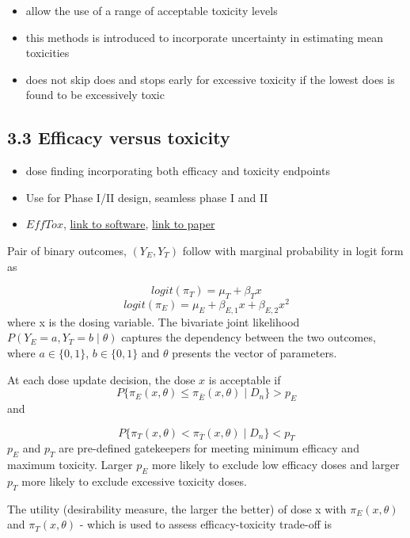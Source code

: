 \documentclass[
]{article}
\providecommand{\tightlist}{%
  \setlength{\itemsep}{0pt}\setlength{\parskip}{0pt}}
\begin{document}
\begin{itemize}
\tightlist
\item
  allow the use of a range of acceptable toxicity levels
\item
  this methods is introduced to incorporate uncertainty in estimating
  mean toxicities
\item
  does not skip does and stops early for excessive toxicity if the
  lowest does is found to be excessively toxic
\end{itemize}

\hypertarget{efficacy-versus-toxicity}{%
\subsection{3.3 Efficacy versus
toxicity}\label{efficacy-versus-toxicity}}

\begin{itemize}
\tightlist
\item
  dose finding incorporating both efficacy and toxicity endpoints
\item
  Use for Phase I/II design, seamless phase I and II
\item
  \(EffTox\),
  \href{https://biostatistics.mdanderson.org/SoftwareDownload/SingleSoftware/Index/2}{link
  to software}, \href{https://www.johndcook.com/efftox.pdf}{link to
  paper}
\end{itemize}

Pair of binary outcomes, \((Y_E, Y_T)\) follow with marginal probability
in logit form as

\[logit(\pi_T) = \mu_T + \beta_T x\]
\[logit(\pi_E) = \mu_E + \beta_{E,1} x + \beta_{E,2} x^2\] where x is
the dosing variable. The bivariate joint likelihood
\(P(Y_E=a, Y_T=b \mid \theta)\) captures the dependency between the two
outcomes, where \(a \in \{0,1\}\), \(b \in \{0,1\}\) and \(\theta\)
presents the vector of parameters.

At each dose update decision, the dose \(x\) is acceptable if
\[ P \{ \pi_{E} (x, \theta) \leq \pi_{\bar{E}} (x, \theta) \mid D_n \} > p_E\]
and

\[P \{ \pi_{T} (x, \theta) < \pi_{\bar{T}} (x, \theta) \mid D_n \} < p_T\]
\(p_E\) and \(p_T\) are pre-defined gatekeepers for meeting minimum
efficacy and maximum toxicity. Larger \(p_E\) more likely to exclude low
efficacy doses and larger \(p_T\) more likely to exclude excessive
toxicity doses.

The utility (desirability measure, the larger the better) of dose x with
\(\pi_E(x, \theta)\) and \(\pi_T(x, \theta)\) - which is used to assess
efficacy-toxicity trade-off is
\end{document}
